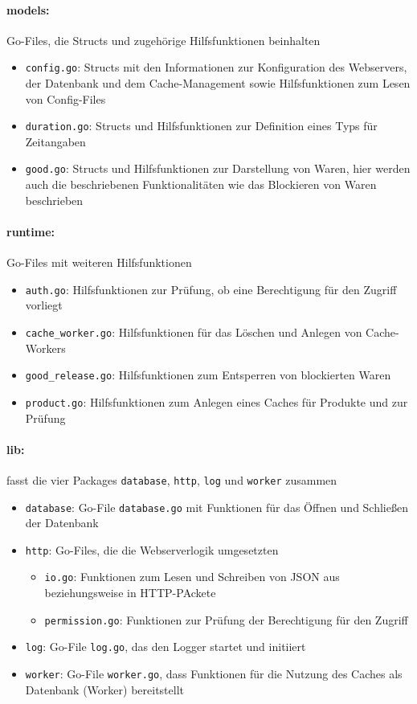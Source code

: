 \paragraph{models:} Go-Files, die Structs und zugehörige Hilfsfunktionen beinhalten
	\begin{itemize}
	\item \texttt{config.go}: Structs mit den Informationen zur Konfiguration des Webservers, der Datenbank und dem Cache-Management sowie Hilfsfunktionen zum Lesen von Config-Files
	\item \texttt{duration.go}: Structs und Hilfsfunktionen zur Definition eines Typs für Zeitangaben
	\item \texttt{good.go}: Structs und Hilfsfunktionen zur Darstellung von Waren, hier werden auch die beschriebenen Funktionalitäten wie das Blockieren von Waren beschrieben
	\end{itemize}


\paragraph{runtime:} Go-Files mit weiteren Hilfsfunktionen
	\begin{itemize}	
	\item \texttt{auth.go}: Hilfsfunktionen zur Prüfung, ob eine Berechtigung für den Zugriff vorliegt
	\item \texttt{cache\_worker.go}: Hilfsfunktionen für das Löschen und Anlegen von Cache-Workers
	\item \texttt{good\_release.go}: Hilfsfunktionen zum Entsperren von blockierten Waren
	\item \texttt{product.go}: Hilfsfunktionen zum Anlegen eines Caches für Produkte und zur Prüfung
	\end{itemize}


\newpage
\paragraph{lib:} fasst die vier Packages \texttt{database}, \texttt{http}, \texttt{log} und \texttt{worker} zusammen

	\begin{itemize}
	\item \texttt{database}: Go-File \texttt{database.go} mit Funktionen für das Öffnen und Schließen der Datenbank
	\item \texttt{http}: Go-Files, die die Webserverlogik umgesetzten
		\begin{itemize}
		\item \texttt{io.go}: Funktionen zum Lesen und Schreiben von JSON aus beziehungsweise in HTTP-PAckete
		\item \texttt{permission.go}: Funktionen zur Prüfung der Berechtigung für den Zugriff
		\end{itemize}	
	\item \texttt{log}: Go-File \texttt{log.go}, das den Logger startet und initiiert
	\item \texttt{worker}: Go-File \texttt{worker.go}, dass Funktionen für die Nutzung des Caches als Datenbank (Worker) bereitstellt 
	\end{itemize}

